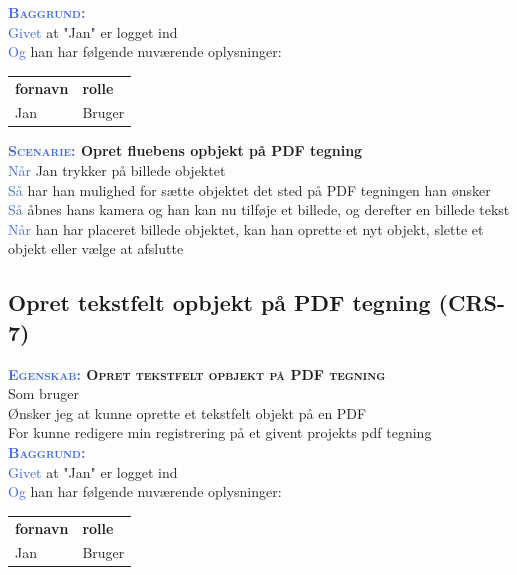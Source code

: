 \textsc{\textcolor{RoyalBlue}{\textbf{Baggrund:}}}\\
\textcolor{RoyalBlue}{Givet} at "Jan" er logget ind\\
\textcolor{RoyalBlue}{Og} han har følgende nuværende oplysninger:\\
\begin{tabular}{| l | l |}
	\textbf{fornavn} & \textbf{rolle} \\
	Jan & Bruger\\
\end{tabular}

\textbf{\textsc{\textcolor{RoyalBlue}{Scenarie:}} Opret fluebens opbjekt på PDF tegning}\\
\textcolor{RoyalBlue}{Når} Jan trykker på billede objektet\\
\textcolor{RoyalBlue}{Så}  har han mulighed for sætte objektet det sted på PDF tegningen han ønsker\\
\textcolor{RoyalBlue}{Så}  åbnes hans kamera og han kan nu tilføje et billede, og derefter en billede tekst\\
\textcolor{RoyalBlue}{Når} han har placeret billede objektet, kan han oprette et nyt objekt, slette et objekt eller vælge at afslutte \\

\subsection{Opret tekstfelt opbjekt på PDF tegning (CRS-7)} \label{sec:USOpretTekstfelt}
\textbf{\textsc{\textcolor{RoyalBlue}{Egenskab:} Opret tekstfelt opbjekt på PDF tegning}}\\
Som bruger\\
Ønsker jeg at kunne oprette et tekstfelt objekt på en PDF\\
For kunne redigere min registrering på et givent projekts pdf tegning\\

\textsc{\textcolor{RoyalBlue}{\textbf{Baggrund:}}}\\
\textcolor{RoyalBlue}{Givet} at "Jan" er logget ind\\
\textcolor{RoyalBlue}{Og} han har følgende nuværende oplysninger:\\
\begin{tabular}{| l | l |}
	\textbf{fornavn} & \textbf{rolle} \\
	Jan & Bruger\\
\end{tabular}

